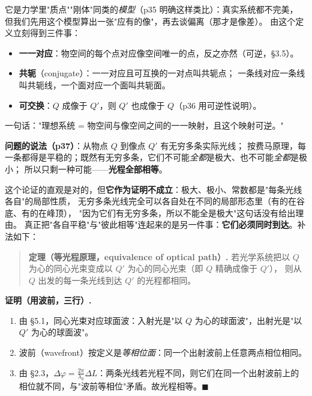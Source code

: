 \documentclass[11pt]{ctexart}
\begin{document}
它是力学里"质点""刚体"同类的\emph{模型}（p35 明确这样类比）：真实系统都不完美，
但我们先用这个模型算出一张"应有的像"，再去谈偏离（那才是像差）。
由这个定义立刻得到三件事：
\begin{itemize}
\item \textbf{一一对应}：物空间的每个点对应像空间唯一的点，反之亦然（可逆，§3.5）。
\item \textbf{共轭}（conjugate）：一一对应且可互换的一对点叫共轭点；
一条线对应一条线叫共轭线，一个面对应一个面叫共轭面。
\item \textbf{可交换}：$Q$ 成像于 $Q'$，则 $Q'$ 也成像于 $Q$（p36 用可逆性说明）。
\end{itemize}
一句话："理想系统 = 物空间与像空间之间的一一映射，且这个映射可逆。"



\textbf{问题的说法（p37）}：从物点 $Q$ 到像点 $Q'$ 有无穷多条实际光线；
按费马原理，每一条都得是平稳的；既然有无穷多条，它们不可能\emph{全都}是极大、也不可能\emph{全都}是极小；
所以只剩一种可能——\textbf{光程全部相等}。

这个论证的直观是对的，但\textbf{它作为证明不成立}：极大、极小、常数都是"每条光线各自"的局部性质，
无穷多条光线完全可以各自处在不同的局部形态里（有的在谷底、有的在峰顶），
"因为它们有无穷多条，所以不能全是极大"这句话没有给出理由。
真正把"各自平稳"与"彼此相等"连起来的是另一件事：\textbf{它们必须同时到达}。补法如下：

\begin{quote}
\textbf{定理（等光程原理，equivalence of optical path）.}\quad
若光学系统把以 $Q$ 为心的同心光束变成以 $Q'$ 为心的同心光束（即 $Q$ 精确成像于 $Q'$），
则从 $Q$ 出发的每一条光线到达 $Q'$ 的光程都相同。
\end{quote}

\textbf{证明（用波前，三行）.}
\begin{enumerate}[label=(\roman*)]
\item 由 §5.1，同心光束对应球面波：入射光是"以 $Q$ 为心的球面波"，出射光是"以 $Q'$ 为心的球面波"。
\item 波前（wavefront）按定义是\emph{等相位面}：同一个出射波前上任意两点相位相同。
\item 由 §2.3，$\Delta\varphi=\frac{2\pi}{\lambda_0}\Delta L$：两条光线若光程不同，则它们在同一个出射波前上的相位就不同，与"波前等相位"矛盾。故光程相等。$\blacksquare$
\end{enumerate}
\end{document}
